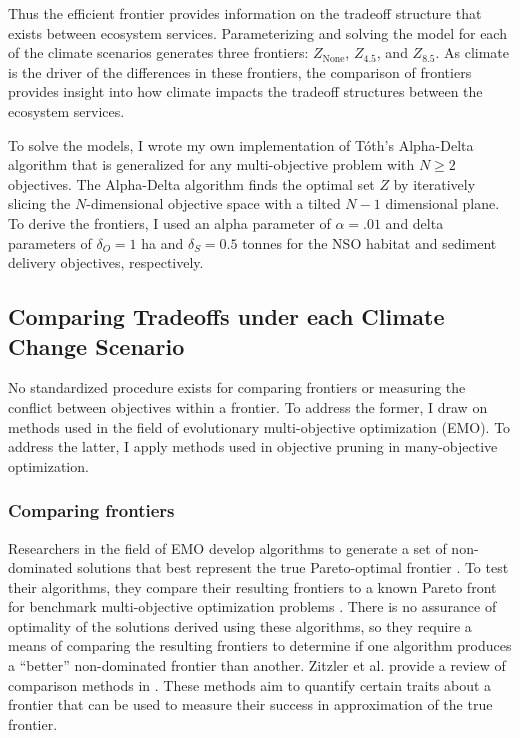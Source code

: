 Thus the efficient frontier provides information on the tradeoff structure that exists between ecosystem services. Parameterizing and solving the model for each of the climate scenarios generates three frontiers: $Z_{\text{None}}$, $Z_{4.5}$, and $Z_{8.5}$. As climate is the driver of the differences in these frontiers, the comparison of frontiers provides insight into how climate impacts the tradeoff structures between the ecosystem services.

To solve the models, I wrote my own implementation of T\'{o}th's Alpha-Delta algorithm \cite{TothThesis} that is generalized for any multi-objective problem with $N \ge 2$ objectives. The Alpha-Delta algorithm finds the optimal set $Z$ by iteratively slicing the $N$-dimensional objective space with a tilted $N-1$ dimensional plane. To derive the frontiers, I used an alpha parameter of $\alpha = .01$ and delta parameters of $\delta_{O} = 1$ ha and $\delta_S = 0.5$ tonnes for the NSO habitat and sediment delivery objectives, respectively.

\subsection{Comparing Tradeoffs under each Climate Change Scenario}

No standardized procedure exists for comparing frontiers or measuring the conflict between objectives within a frontier. To address the former, I draw on methods used in the field of evolutionary multi-objective optimization (EMO). To address the latter, I apply methods used in objective pruning in many-objective optimization.

\subsubsection{Comparing frontiers}
Researchers in the field of EMO develop algorithms to generate a set of non-dominated solutions that best represent the true Pareto-optimal frontier \cite{deb2001multi}. To test their algorithms, they compare their resulting frontiers to a known Pareto front for benchmark multi-objective optimization problems \cite{knowles2002metrics}. There is no assurance of optimality of the solutions derived using these algorithms, so they require a means of comparing the resulting frontiers to determine if one algorithm produces a ``better'' non-dominated frontier than another. Zitzler et al. provide a review of comparison methods in \cite{zitzler2003performance}. These methods aim to quantify certain traits about a frontier that can be used to measure their success in approximation of the true frontier.

